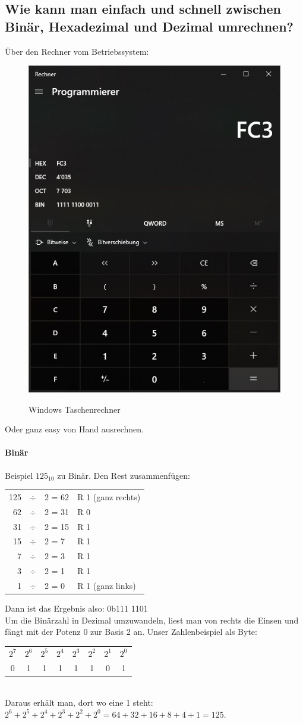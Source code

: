 \pagebreak
\subsection*{Wie kann man einfach und schnell zwischen Binär, Hexadezimal und Dezimal umrechnen?}
    Über den Rechner vom Betriebssystem:
    \begin{figure}[H]
        \begin{center}
        \label{pic:calc}
        \includegraphics[width=.5\textwidth]{images/calc.jpg}
        \caption{Windows Taschenrechner}
        \end{center}
    \end{figure}
    Oder ganz easy von Hand ausrechnen.
    \paragraph{Binär}Beispiel $125_{10}$ zu Binär. Den Rest zusammenfügen:\\
    \begin{tabular}{rcll}
        125&$\div$&2 = 62&R 1 (ganz rechts)\\
        62&$\div$&2 = 31&R 0\\
        31&$\div$&2 = 15&R 1\\
        15&$\div$&2 = 7&R 1\\
        7&$\div$&2 = 3&R 1\\
        3&$\div$&2 = 1&R 1\\
        1&$\div$&2 = 0&R 1 (ganz links)\\[1em]
\end{tabular}
Dann ist das Ergebnis also: 0b111 1101\\[1em]
Um die Binärzahl in Dezimal umzuwandeln, liest man von rechts die Einsen und fängt mit der Potenz 0 zur Basis 2 an. Unser Zahlenbeispiel als Byte:\\[1em]
\begin{tabular}{cccccccc}
    $2^7$&$2^6$&$2^5$&$2^4$&$2^3$&$2^2$&$2^1$&$2^0$\\
    0&1&1&1&1&1&0&1\\
\end{tabular}\\[1em]
Daraus erhält man, dort wo eine 1 steht:\\$2^6+2^5+2^4+2^3+2^2+2^0=64+32+16+8+4+1=125$.

